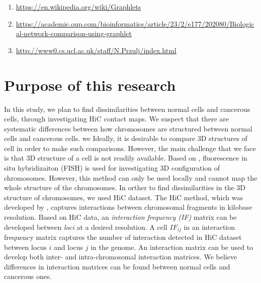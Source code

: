 \documentclass{article}
\begin{document}
\begin{enumerate}
    \item \url{https://en.wikipedia.org/wiki/Graphlets}
    \item \url{https://academic.oup.com/bioinformatics/article/23/2/e177/202080/Biological-network-comparison-using-graphlet}
    \item \url{http://www0.cs.ucl.ac.uk/staff/N.Przulj/index.html}
\end{enumerate}
\section{Purpose of this research}

In this study, we plan to find dissimilarities between normal cells and cancerous cells,
through investigating HiC contact maps. 
We suspect that there are systematic differences between how chromosomes are structured
between normal cells and cancerous cells.
we 
Ideally, it is desirable to compare 3D structures of 
cell in order to make such comparisons.
However, the main challenge that we face is that 
3D structure of a cell is not readily available. Based on
\cite{adhikari2016chromosome3d}, fluorescence in situ hybridizaiton
(FISH) is used for investigating 3D configuration of chromosomes.
However, this method can only be used locally and cannot map
the whole structure of the chromosomes.
In orther to find dissimilarities in the 3D structure of 
chromosomes, we used HiC dataset.
The HiC method, which was developed by \cite{lieberman2009comprehensive}, captures interactions between 
chromosomal fragments in kilobase resolution. Based on HiC data, an
\textit{interaction frequency (IF) } matrix can be developed between \textit{loci} at a desired resolution.
A cell $IF_{ij}$ in an interaction frequency matrix captures the number of interaction detected
in HiC dataset between locus $i$ and locus $j$ in the genome.
An interaction matrix can be used to develop both inter- and intra-chromosomal interaction matrices.
We believe differences in interaction matrices can be found between normal cells and cancerous ones.
\end{document}
